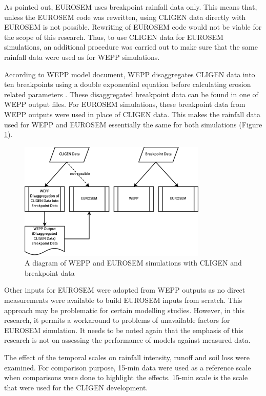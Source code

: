 As pointed out, EUROSEM uses breakpoint rainfall data only. This means that,
unless the EUROSEM code was rewritten, using CLIGEN data directly with EUROSEM
is not possible. Rewriting of EUROSEM code would not be viable for the scope of
this research. Thus, to use CLIGEN data for EUROSEM simulations, an additional
procedure was carried out to make sure that the same rainfall data were used as
for WEPP simulations.

According to WEPP model document, WEPP disaggregates CLIGEN data into ten
breakpoints using a double exponential equation before calculating erosion
related parameters \citep[see][\S 2.2]{flanagan1995-usda}. These disaggregated
breakpoint data can be found in one of WEPP output files. For EUROSEM
simulations, these breakpoint data from WEPP outputs were used in place of
CLIGEN data. This makes the rainfall data used for WEPP and EUROSEM essentially
the same for both simulations (Figure \ref{fig:eurosem_cligen_workaround}).

\begin{figure}[htbp]
  \centering
    \includegraphics[width=0.8\textwidth]{./img/eurosem_cligen_workaround}
  \caption{A diagram of WEPP and EUROSEM simulations with CLIGEN and breakpoint
data}
  \label{fig:eurosem_cligen_workaround}
\end{figure}

Other inputs for EUROSEM were adopted from WEPP outputs as no direct
measurements were available to build EUROSEM inputs from scratch. This approach
may be problematic for certain modelling studies. However, in this research, it
permits a workaround to problems of unavailable factors for EUROSEM simulation.
It needs to be noted again that the emphasis of this research is not on
assessing the performance of models against measured data.

The effect of the temporal scales on rainfall intensity, runoff and soil loss
were examined. For comparison purpose, 15-min data were used as a reference
scale when comparisons were done to highlight the effects. 15-min scale is
the scale that were used for the CLIGEN development.


